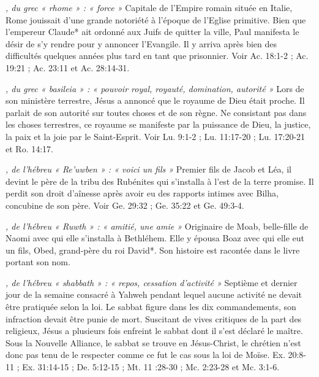 \begin{multicols}{2}
\textit{, du grec « rhome » : « force »}\newline
Capitale de l'Empire romain située en Italie, Rome jouissait d'une grande notoriété à l'époque de l'Eglise primitive. Bien que l'empereur Claude* ait ordonné aux Juifs de quitter la ville, Paul manifesta le désir de s'y rendre pour y annoncer l'Evangile. Il y arriva après bien des difficultés quelques années plus tard en tant que prisonnier. Voir Ac. 18:1-2 ; Ac. 19:21 ; Ac. 23:11 et Ac. 28:14-31.

\textit{, du grec « basileia » : « pouvoir royal, royauté, domination, autorité »}\newline
Lors de son ministère terrestre, Jésus a annoncé que le royaume de Dieu était proche. Il parlait de son autorité sur toutes choses et de son règne. Ne consistant pas dans les choses terrestres, ce royaume se manifeste par la puissance de Dieu, la justice, la paix et la joie par le Saint-Esprit. Voir Lu. 9:1-2 ; Lu. 11:17-20 ; Lu. 17:20-21 et Ro. 14:17.

\textit{, de l'hébreu « Re'uwben » : « voici un fils »}\newline
Premier fils de Jacob et Léa, il devint le père de la tribu des Rubénites qui s'installa à l'est de la terre promise. Il perdit son droit d'aînesse après avoir eu des rapports intimes avec Bilha, concubine de son père. Voir Ge. 29:32 ; Ge. 35:22 et Ge. 49:3-4.

\textit{, de l'hébreu « Ruwth » : « amitié, une amie »}\newline
Originaire de Moab, belle-fille de Naomi avec qui elle s'installa à Bethléhem. Elle y épousa Boaz avec qui elle eut un fils, Obed, grand-père du roi David*. Son histoire est racontée dans le livre portant son nom.

\textit{, de l'hébreu « shabbath » : « repos, cessation d'activité »}\newline
Septième et dernier jour de la semaine consacré à Yahweh pendant lequel aucune activité ne devait être pratiquée selon la loi. Le sabbat figure dans les dix commandements, son infraction devait être punie de mort. Suscitant de vives critiques de la part des religieux, Jésus a plusieurs fois enfreint le sabbat dont il s'est déclaré le maître. Sous la Nouvelle Alliance, le sabbat se trouve en Jésus-Christ, le chrétien n'est donc pas tenu de le respecter comme ce fut le cas sous la loi de Moïse. Ex. 20:8-11 ; Ex. 31:14-15 ; De. 5:12-15 ; Mt. 11 :28-30 ; Mc. 2:23-28 et Mc. 3:1-6.


\end{multicols}
